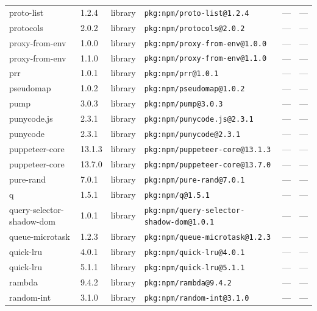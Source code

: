 \documentclass[11pt,a4paper]{article}
\begin{document}
\begin{longtable}{|p{4cm}|p{2cm}|p{1.6cm}|p{5cm}|p{1.5cm}|p{3.5cm}|}
\raggedright proto-list & 1.2.4 & library & \small\texttt{pkg:npm/proto-list@1.2.4} & — & \small — \\
\raggedright protocols & 2.0.2 & library & \small\texttt{pkg:npm/protocols@2.0.2} & — & \small — \\
\raggedright proxy-from-env & 1.0.0 & library & \small\texttt{pkg:npm/proxy-from-env@1.0.0} & — & \small — \\
\raggedright proxy-from-env & 1.1.0 & library & \small\texttt{pkg:npm/proxy-from-env@1.1.0} & — & \small — \\
\raggedright prr & 1.0.1 & library & \small\texttt{pkg:npm/prr@1.0.1} & — & \small — \\
\raggedright pseudomap & 1.0.2 & library & \small\texttt{pkg:npm/pseudomap@1.0.2} & — & \small — \\
\raggedright pump & 3.0.3 & library & \small\texttt{pkg:npm/pump@3.0.3} & — & \small — \\
\raggedright punycode.js & 2.3.1 & library & \small\texttt{pkg:npm/punycode.js@2.3.1} & — & \small — \\
\raggedright punycode & 2.3.1 & library & \small\texttt{pkg:npm/punycode@2.3.1} & — & \small — \\
\raggedright puppeteer-core & 13.1.3 & library & \small\texttt{pkg:npm/puppeteer-core@13.1.3} & — & \small — \\
\raggedright puppeteer-core & 13.7.0 & library & \small\texttt{pkg:npm/puppeteer-core@13.7.0} & — & \small — \\
\raggedright pure-rand & 7.0.1 & library & \small\texttt{pkg:npm/pure-rand@7.0.1} & — & \small — \\
\raggedright q & 1.5.1 & library & \small\texttt{pkg:npm/q@1.5.1} & — & \small — \\
\raggedright query-selector-shadow-dom & 1.0.1 & library & \small\texttt{pkg:npm/query-selector-shadow-dom@1.0.1} & — & \small — \\
\raggedright queue-microtask & 1.2.3 & library & \small\texttt{pkg:npm/queue-microtask@1.2.3} & — & \small — \\
\raggedright quick-lru & 4.0.1 & library & \small\texttt{pkg:npm/quick-lru@4.0.1} & — & \small — \\
\raggedright quick-lru & 5.1.1 & library & \small\texttt{pkg:npm/quick-lru@5.1.1} & — & \small — \\
\raggedright rambda & 9.4.2 & library & \small\texttt{pkg:npm/rambda@9.4.2} & — & \small — \\
\raggedright random-int & 3.1.0 & library & \small\texttt{pkg:npm/random-int@3.1.0} & — & \small — \\

\end{longtable}
\end{document}
